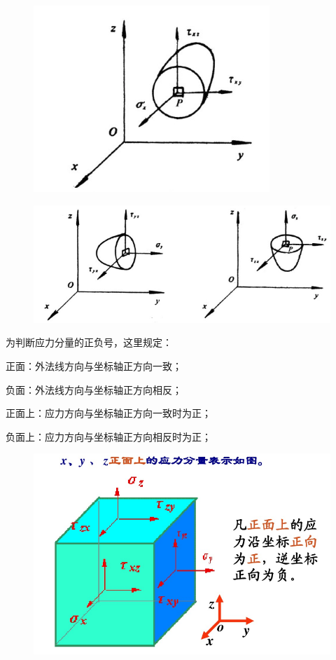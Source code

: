 \documentclass[12pt,a4paper]{article}
\begin{document}
\begin{figure}[H]
\centering
\includegraphics[scale=0.5]{./figures/4.png}
\caption{}
\end{figure}

\begin{figure}[H]
\centering
\includegraphics[scale=0.5]{./figures/5.png}
\caption{}
\end{figure}

为判断应力分量的正负号，这里规定：

正面：外法线方向与坐标轴正方向一致；

负面：外法线方向与坐标轴正方向相反；

正面上：应力方向与坐标轴正方向一致时为正；

负面上：应力方向与坐标轴正方向相反时为正；

\begin{figure}[H]
\centering
\includegraphics[scale=0.5]{./figures/18.png}
\caption{}
\end{figure}
\end{document}
